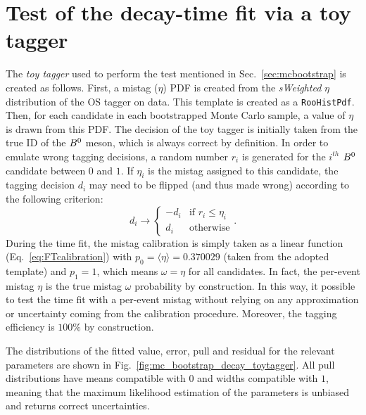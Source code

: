 \section{Test of the decay-time fit via a toy tagger}
\label{app:toytagger}

The \emph{toy tagger} used to perform the test mentioned in Sec.~\ref{sec:mcbootstrap} is created as follows. First, a mistag ($\eta$) PDF is created from the \emph{sWeighted} $\eta$ distribution of the OS tagger on data. This template is created as a \texttt{RooHistPdf}. Then, for each candidate in each bootstrapped Monte Carlo sample, a value of $\eta$ is drawn from this PDF. The decision of the toy tagger is initially taken from the true ID of the $B^0$ meson, which is always correct by definition. In order to emulate wrong tagging decisions, a random number $r_i$ is generated for the $i^{th}$ $B^0$ candidate between $0$ and $1$. If $\eta_i$ is the mistag assigned to this candidate, the tagging decision $d_i$ may need to be flipped (and thus made wrong) according to the following criterion:
\begin{equation}
  d_i \to \begin{cases} -d_i &\text{if $r_i\leq\eta_i$} \\ d_i &\text{otherwise} \end{cases}. 
\end{equation}
During the time fit, the mistag calibration is simply taken as a linear function (Eq.~\ref{eq:FTcalibration}) with $p_0=\langle\eta\rangle=0.370029$ (taken from the adopted template) and $p_1=1$, which means $\omega=\eta$ for all candidates. In fact, the per-event mistag $\eta$ is the true mistag $\omega$ probability by construction. In this way, it possible to test the time fit with a per-event mistag without relying on any approximation or uncertainty coming from the calibration procedure. Moreover, the tagging efficiency is $100\%$ by construction. 

The distributions of the fitted value, error, pull and residual for the relevant parameters are shown in Fig.~\ref{fig:mc_bootstrap_decay_toytagger}. All pull distributions have means compatible with $0$ and widths compatible with $1$, meaning that the maximum likelihood estimation of the parameters is unbiased and returns correct uncertainties.

